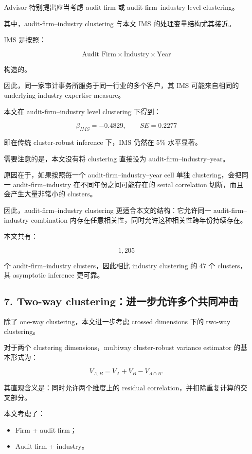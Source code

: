 \documentclass[11pt]{article}
\begin{document}
Advisor 特别提出应当考虑 audit-firm 或 audit-firm--industry level clustering。

其中，audit-firm--industry clustering 与本文 IMS 的处理变量结构尤其接近。

IMS 是按照：

\[
\text{Audit Firm} \times \text{Industry} \times \text{Year}
\]

构造的。

因此，同一家审计事务所服务于同一行业的多个客户，其 IMS 可能来自相同的 underlying industry expertise measure。

本文在 audit-firm--industry level clustering 下得到：

\[
\beta_{IMS}=-0.4829,\qquad
SE=0.2277
\]

即在传统 cluster-robust inference 下，IMS 仍然在 5\% 水平显著。

需要注意的是，本文没有将 clustering 直接设为 audit-firm--industry--year。

原因在于，如果按照每一个 audit-firm--industry--year cell 单独 clustering，会把同一 audit-firm--industry 在不同年份之间可能存在的 serial correlation 切断，而且会产生大量非常小的 clusters。

因此，audit-firm--industry clustering 更适合本文的结构：它允许同一 audit-firm--industry combination 内存在任意相关性，同时允许这种相关性跨年份持续存在。

本文共有：

\[
1,205
\]

个 audit-firm--industry clusters，因此相比 industry clustering 的 47 个 clusters，其 asymptotic inference 更可靠。

\subsection{7. Two-way clustering：进一步允许多个共同冲击}

除了 one-way clustering，本文进一步考虑 crossed dimensions 下的 two-way clustering。

对于两个 clustering dimensions，multiway cluster-robust variance estimator 的基本形式为：

\[
V_{A,B}=V_A+V_B-V_{A\cap B}.
\]

其直观含义是：同时允许两个维度上的 residual correlation，并扣除重复计算的交叉部分。

本文考虑了：

\begin{itemize}
    \item Firm + audit firm；
    \item Audit firm + industry。
\end{itemize}
\end{document}

